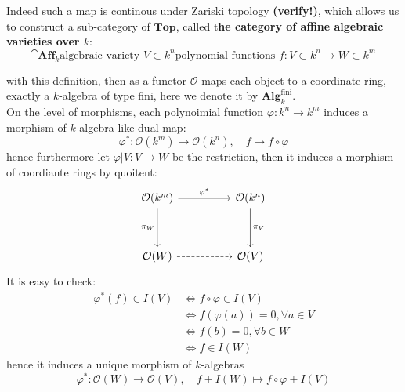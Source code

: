 Indeed such a map is continous under Zariski topology \textbf{(verify!)}, which allows us to construct a sub-category of \(\mathbf{Top}\), called t\textbf{he category of affine algebraic varieties over \(k\)}:
\[\cat{\mathbf{Aff}_k}{\text{algebraic variety } V \subset k^n}{\text{polynomial functions } f: V\subset k^n \to W \subset k^m}\]

with this definition, then as a functor \(\mathcal{O}\) maps each object to a coordinate ring, exactly a \(k\)-algebra of type fini, here we denote it by \(\mathbf{Alg}_k^{\text{fini}}\).\\

On the level of morphisms, each polynoimial function \(\varphi:k^n \to k^m\) induces a morphism of \(k\)-algebra like dual map:
\[\varphi^*: \mathcal{O}(k^m) \to \mathcal{O}(k^n), \quad f \mapsto f\circ \varphi \]
hence furthermore let \(\varphi|V:V \to W\) be the restriction, then it induces a morphism of coordiante rings by quoitent:
\[\begin{tikzcd}
	{\mathcal{O}(k^m)} && {\mathcal{O}(k^n)} \\
	\\
	{\mathcal{O}(W)} && {\mathcal{O}(V)}
	\arrow["{\varphi^*}", from=1-1, to=1-3]
	\arrow["{\pi_W}"', from=1-1, to=3-1]
	\arrow["{\pi_V}", from=1-3, to=3-3]
	\arrow[dashed, from=3-1, to=3-3]
\end{tikzcd}\]
It is easy to check:
\begin{align*}
    \varphi^*(f) \in I(V) &\iff f \circ \varphi \in I(V) \\
    &\iff f(\varphi(a)) = 0, \forall a \in V\\
    &\iff f(b) = 0, \forall b \in W \quad\\
    &\iff f \in I(W)
\end{align*}
hence it induces a unique morphism of \(k\)-algebras
\[\varphi^*: \mathcal{O}(W) \to \mathcal{O}(V), \quad f+I(W) \mapsto f \circ \varphi + I(V)\]

